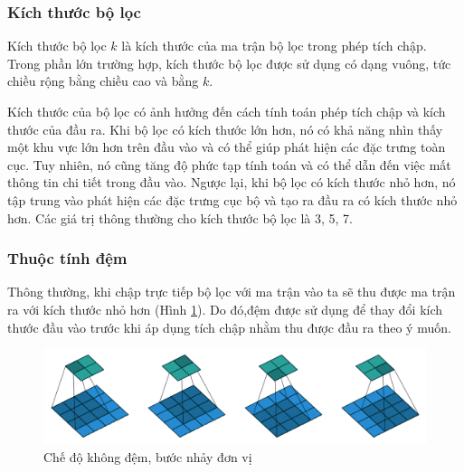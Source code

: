 \subsubsection{Kích thước bộ lọc}

Kích thước bộ lọc $k$ là kích thước của ma trận bộ lọc trong phép tích chập. Trong phần lớn trường hợp, kích thước bộ lọc được sử dụng có dạng vuông, tức chiều rộng bằng chiều cao và bằng $k$. 

Kích thước của bộ lọc có ảnh hưởng đến cách tính toán phép tích chập và kích thước của đầu ra. Khi bộ lọc có kích thước lớn hơn, nó có khả năng nhìn thấy một khu vực lớn hơn trên đầu vào và có thể giúp phát hiện các đặc trưng toàn cục. Tuy nhiên, nó cũng tăng độ phức tạp tính toán và có thể dẫn đến việc mất thông tin chi tiết trong đầu vào. Ngược lại, khi bộ lọc có kích thước nhỏ hơn, nó tập trung vào phát hiện các đặc trưng cục bộ và tạo ra đầu ra có kích thước nhỏ hơn. Các giá trị thông thường cho kích thước bộ lọc là 3, 5, 7.

\subsubsection{Thuộc tính đệm}

Thông thường, khi chập trực tiếp bộ lọc với ma trận vào ta sẽ thu được ma trận ra với kích thước nhỏ hơn (Hình \ref{fig:no-padding-unit-stride}). Do đó,đệm được sử dụng để thay đổi kích thước đầu vào trước khi áp dụng tích chập nhằm thu được đầu ra theo ý muốn.

\begin{figure}[h]
	\centering
	\includegraphics[width=0.9\linewidth]{images/no-padding-unit-stride}
	\caption{Chế độ không đệm, bước nhảy đơn vị}
	\label{fig:no-padding-unit-stride}
\end{figure}

